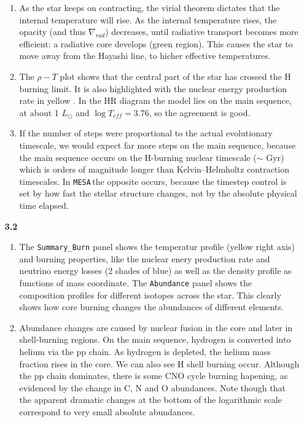 \documentclass[11pt,a4paper]{article}
\newcommand{\MESA}{\texttt{MESA}\,}
\begin{document}
\begin{enumerate}
\begin{enumerate}
\item As the star keeps on contracting, the virial theorem dictates that the internal temperature will rise. 
As the internal temperature rises, the opacity (and thus $\nabla_{rad}$) decreases, until radiative transport becomes more efficient: a radiative core develops (green region). This causes the star to move away from the Hayashi line, to hicher effective temperatures. 


\item
The $\rho-T$ plot shows that  the central part of the star has crossed the H burning limit. It is also highlighted with the nuclear energy production rate in yellow . 
In the HR diagram the model lies on the main sequence, at about 1 $L_\odot$ and $\log T_{eff} = 3.76$, so the agreement is good. 

\item If the number of steps were proportional to the actual evolutionary timescale, we would expect far more steps on the main sequence, because the main sequence occurs on the H-burning nuclear timescale ($\sim$ Gyr) which is orders of magnitude longer than Kelvin–Helmholtz contraction timescales. In \MESA the opposite occurs, because the timestep control is set by how fast the stellar structure changes, not by the absolute physical time elapsed.

\end{enumerate}


\item[\bf{3.2}] 
\begin{enumerate}
\item The \texttt{Summary\_Burn} panel shows the temperatur profile (yellow right axis) and burning properties, like the nuclear enery production rate and neutrino energy losses (2 shades of blue) as well as the density profile as functions of mass coordinate.
 The \texttt{Abundance} panel shows the composition profiles for different isotopes across the star. This clearly shows how core burning changes the abundances of different elements. 


\item Abundance changes are caused by nuclear fusion in the core and later in shell-burning regions. On the main sequence, hydrogen is converted into helium via the pp chain. As hydrogen is depleted, the helium mass fraction rises in the core. 
We can also see H shell burning occur. Although the pp chain dominates, there is some CNO cycle burning hapening, as evidenced by the change in C, N and O abundances. Note though that the apparent dramatic changes at the bottom of the logarithmic scale correspond to very small absolute abundances.



\end{enumerate}
\end{enumerate}
\end{document}
